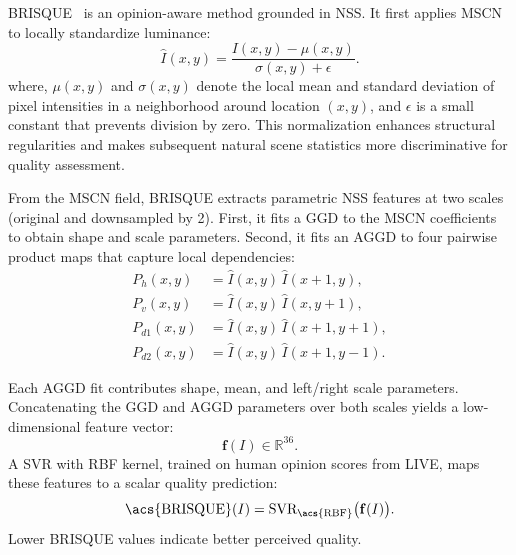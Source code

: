 \acf{BRISQUE}~\cite{mittal2012brisque} is an opinion-aware method grounded in \acf{NSS}. It first applies \acf{MSCN} to locally standardize luminance:
\begin{equation}
\hat{I}(x, y) = \frac{I(x, y) - \mu(x, y)}{\sigma(x, y) + \epsilon}.
\end{equation}
where, $\mu(x,y)$ and $\sigma(x,y)$ denote the local mean and standard deviation of pixel intensities in a neighborhood around location $(x,y)$, and $\epsilon$ is a small constant that prevents division by zero. 
This normalization enhances structural regularities and makes subsequent natural scene statistics more discriminative for quality assessment.

From the \acs{MSCN} field, \acs{BRISQUE} extracts parametric \acs{NSS} features at two scales (original and downsampled by 2). First, it fits a \acf{GGD} to the \acs{MSCN} coefficients to obtain shape and scale parameters. Second, it fits an \acf{AGGD} to four pairwise product maps that capture local dependencies:
\begin{align}
P_h(x,y)   &= \hat{I}(x,y)\,\hat{I}(x{+}1,y),\\
P_v(x,y)   &= \hat{I}(x,y)\,\hat{I}(x,y{+}1),\\
P_{d1}(x,y) &= \hat{I}(x,y)\,\hat{I}(x{+}1,y{+}1),\\
P_{d2}(x,y) &= \hat{I}(x,y)\,\hat{I}(x{+}1,y{-}1).
\end{align}

Each \acs{AGGD} fit contributes shape, mean, and left/right scale parameters. Concatenating the \acs{GGD} and \acs{AGGD} parameters over both scales yields a low-dimensional feature vector:
\begin{equation}
\mathbf{f}(I) \in \mathbb{R}^{36}.
\end{equation}
A \acf{SVR} with \acf{RBF} kernel, trained on human opinion scores from \acs{LIVE}, maps these features to a scalar quality prediction:
\begin{equation}
\text{\acs{BRISQUE}}(I) = \text{SVR}_{\text{\acs{RBF}}}\big(\mathbf{f}(I)\big).
\end{equation}
Lower \acs{BRISQUE} values indicate better perceived quality.

